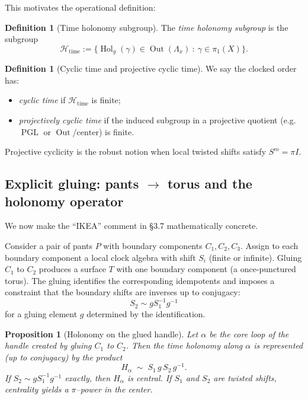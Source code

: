 \documentclass[11pt,oneside]{amsbook}
\numberwithin{equation}{section}
\theoremstyle{plain}
\newtheorem{proposition}[theorem]{Proposition}
\theoremstyle{definition}
\newtheorem{definition}[theorem]{Definition}
\theoremstyle{remark}
\DeclareMathOperator{\Hol}{\mathrm{Hol}}
\DeclareMathOperator{\PGL}{\mathrm{PGL}}
\DeclareMathOperator{\Out}{\mathrm{Out}}
\newcommand{\cH}{\mathcal{H}}
\begin{document}
This motivates the operational definition:

\begin{definition}[Time holonomy subgroup]
The \emph{time holonomy subgroup} is the subgroup
\[
\cH_{\mathrm{time}}:=\{\Hol_g(\gamma)\in \Out(\Lambda_x)\ :\ \gamma\in\pi_1(X)\}.
\]
\end{definition}

\begin{definition}[Cyclic time and projective cyclic time]
We say the clocked order has:
\begin{itemize}
\item \emph{cyclic time} if $\cH_{\mathrm{time}}$ is finite;
\item \emph{projectively cyclic time} if the induced subgroup in a projective quotient (e.g.\ $\PGL$ or $\Out/\text{center}$) is finite.
\end{itemize}
\end{definition}

Projective cyclicity is the robust notion when local twisted shifts satisfy $S^m=\pi I$.

\subsection{Explicit gluing: pants $\rightarrow$ torus and the holonomy operator}
\label{sec:pants_torus}

We now make the ``IKEA'' comment in  \S3.7 mathematically concrete.

Consider a pair of pants $P$ with boundary components $C_1,C_2,C_3$.
Assign to each boundary component a local clock algebra with shift $S_i$ (finite or infinite).
Gluing $C_1$ to $C_2$ produces a surface $T$ with one boundary component (a once-punctured torus).
The gluing identifies the corresponding idempotents and imposes a constraint that the boundary shifts are inverses up to conjugacy:
\[
S_2 \sim g S_1^{-1} g^{-1}
\]
for a gluing element $g$ determined by the identification.

\begin{proposition}[Holonomy on the glued handle]
\label{prop:handle_holonomy}
Let $\alpha$ be the core loop of the handle created by gluing $C_1$ to $C_2$.
Then the time holonomy along $\alpha$ is represented (up to conjugacy) by the product
\[
H_\alpha \;\sim\; S_1\, g\, S_2\, g^{-1}.
\]
If $S_2\sim g S_1^{-1} g^{-1}$ exactly, then $H_\alpha$ is central.
If $S_1$ and $S_2$ are twisted shifts, centrality yields a $\pi$--power in the center.
\end{proposition}
\end{document}
